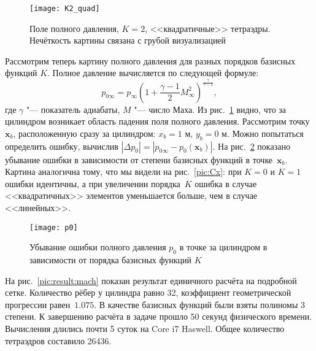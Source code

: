 \begin{figure}[ht]
	\centering
	\texttt{[image: K2\_quad]}
	\caption{Поле полного давления, \(K = 2\), <<квадратичные>> тетраэдры. Нечёткость картины связана с грубой визуализацией}
	\label{pic:p_stagnation}
\end{figure}

Рассмотрим теперь картину полного давления для разных порядков базисных функций \(K\). Полное давление вычисляется по следующей формуле: 
\[p_{0\infty} = p_\infty \left(1 + \frac{\gamma-1}{2}M_{\infty}^2\right)^\frac{\gamma}{\gamma - 1},\] 
где \(\gamma\) "--- показатель адиабаты, \(M\) "--- число Маха. Из рис.~\ref{pic:p_stagnation} видно, что за цилиндром возникает область падения поля полного давления. Рассмотрим точку \(\mathbf x_b\), расположенную сразу за цилиндром: \(x_b = 1\) м, \(y_b = 0\) м. Можно попытаться определить ошибку, вычислив \(\left|\Delta p_0\right| = \left|p_{0\infty} - p_0(\mathbf x_b)\right|\). На рис.~\ref{pic:p_error} показано убывание ошибки в зависимости от степени базисных функций в точке~\(\mathbf x_b\). Картина аналогична тому, что мы видели на рис.~\ref{pic:Cx}: при \(K = 0\) и \(K = 1\) ошибки идентичны, а при увеличении порядка~\(K\) ошибка в случае <<квадратичных>> элементов уменьшается больше, чем в случае <<линейных>>.

\begin{figure}[ht]
	\centering
	\texttt{[image: p0]}
	\caption{Убывание ошибки полного давления \(p_{0}\) в точке за цилиндром в зависимости от порядка базисных функций \(K\)}
	\label{pic:p_error}
\end{figure}

На рис.~\ref{pic:result:mach} показан результат единичного расчёта на подробной сетке. Количество рёбер у цилиндра равно 32, коэффициент геометрической прогрессии равен~\(1.075\). В качестве базисных функций были взяты полиномы 3 степени. К завершению расчёта в задаче прошло 50 секунд физического времени. Вычисления длились почти 5 суток на Core i7 Haswell. Общее количество тетраэдров составило 26436.